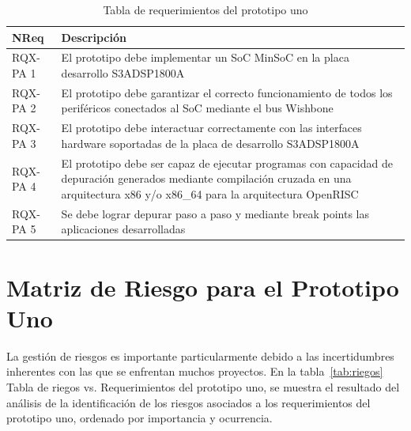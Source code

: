 		\begin{table}[h]
		\centering
		\begin{tabular}{ p{2.5cm} p{12.5cm} }
		\hline 
		\rowcolor[gray]{0.8} N\textordmasculine Req & Descripción\\
		\hline 
		RQX-PA 1 & El prototipo debe implementar un SoC MinSoC en la placa desarrollo S3ADSP1800A\\ 
		\hline 
		RQX-PA 2 & El prototipo debe garantizar el correcto funcionamiento de todos los periféricos conectados al SoC mediante el bus Wishbone\\ 
		\hline 
		RQX-PA 3 & El prototipo debe interactuar correctamente con las interfaces hardware soportadas de la placa de desarrollo S3ADSP1800A\\ 
		\hline
		RQX-PA 4 & El prototipo debe ser capaz de ejecutar programas con capacidad de depuración generados mediante compilación
		cruzada en una arquitectura x86 y/o x86\_64 para la arquitectura OpenRISC\\
		\hline
		RQX-PA 5 & Se debe lograr depurar paso a paso y mediante break points las aplicaciones desarrolladas\\
		\hline		
		\end{tabular}
		\caption{Tabla de requerimientos del prototipo uno}
		\label{tab:tdr1}
		\end{table}

	
	\section{Matriz de Riesgo para el Prototipo Uno}
La gestión de riesgos es importante particularmente debido a las incertidumbres inherentes con las que se enfrentan muchos proyectos. En la tabla~\ref{tab:riegos} Tabla de riegos vs. Requerimientos del prototipo uno, se muestra el resultado del análisis de la identificación de los riesgos asociados a los requerimientos del prototipo uno, ordenado por importancia y ocurrencia.

